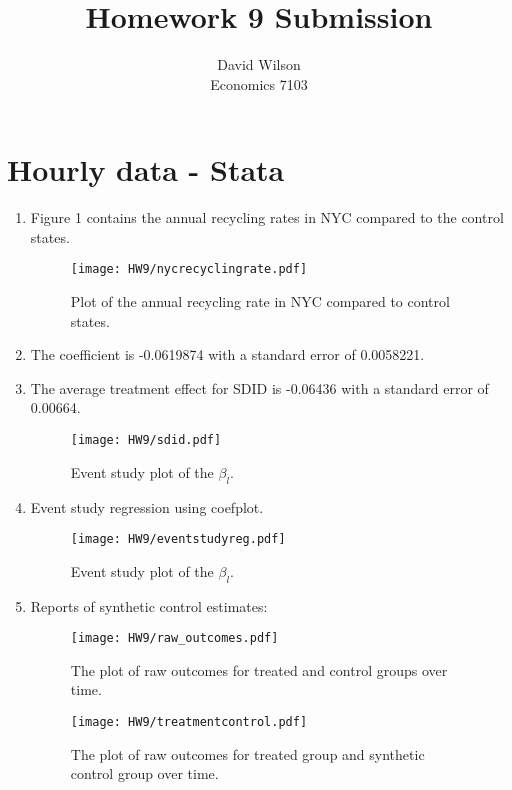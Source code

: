 \documentclass{article}
\title{Homework 9 Submission}
\author{David Wilson \\ Economics 7103}
\begin{document}
  
\maketitle

\section{Hourly data - Stata}

\begin{enumerate}

\item Figure 1 contains the annual recycling rates in NYC compared to the control states.    
\begin{figure}[H]
    \centering
\texttt{[image: HW9/nycrecyclingrate.pdf]}{}
    \caption{Plot of the annual recycling rate in NYC compared to control states.}
    \label{fig:enter-label}
\end{figure}

\item The coefficient is -0.0619874 with a standard error of 0.0058221.

\item The average treatment effect for SDID is -0.06436 with a standard error of 0.00664. 

\begin{figure}[H]
    \centering
\texttt{[image: HW9/sdid.pdf]}{}
    \caption{Event study plot of the $\beta_l$.}
    \label{fig:enter-label}
\end{figure}

\item Event study regression using coefplot.

\begin{figure}[H]
    \centering
\texttt{[image: HW9/eventstudyreg.pdf]}{}
    \caption{Event study plot of the $\beta_l$.}
    \label{fig:enter-label}
\end{figure}

\item Reports of synthetic control estimates:           

\begin{figure}[H]
    \centering
\texttt{[image: HW9/raw\_outcomes.pdf]}{}
    \caption{The plot of raw outcomes for treated and control groups over time.}
    \label{fig:enter-label}
\end{figure}

\begin{figure}[H]
    \centering
\texttt{[image: HW9/treatmentcontrol.pdf]}{}
    \caption{The plot of raw outcomes for treated group and synthetic control group over time.}
    \label{fig:enter-label}
\end{figure}


\end{enumerate}
\end{document}
